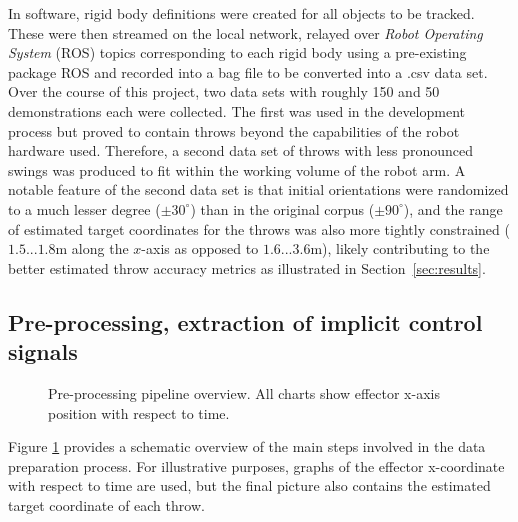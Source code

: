 \documentclass{article}
\begin{document}
In software, rigid body definitions were created for all objects to be tracked. These were then streamed on the local network, relayed over \emph{Robot Operating System} (ROS) topics corresponding to each rigid body using a pre-existing package ROS and recorded into a bag file to be converted into a .csv data set. Over the course of this project, two data sets with roughly 150 and 50 demonstrations each were collected. The first was used in the development process but proved to contain throws beyond the capabilities of the robot hardware used. Therefore, a second data set of throws with less pronounced swings was produced to fit within the working volume of the robot arm. A notable feature of the second data set is that initial orientations were randomized to a much lesser degree ($\pm30^{\circ}$) than in the original corpus ($\pm90^{\circ}$), and the range of estimated target coordinates for the throws was also more tightly constrained ($1.5 ... 1.8$m along the $x$-axis as opposed to $1.6 ... 3.6$m), likely contributing to the better estimated throw accuracy metrics as illustrated in Section~\ref{sec:results}.

\subsection{Pre-processing, extraction of implicit control signals}
\label{sec:preprocess}

\begin{figure}
	\centering
	\caption{Pre-processing pipeline overview. All charts show effector x-axis position with respect to time.}
	\label{fig:fig2}
\end{figure}

Figure \ref{fig:fig2} provides a schematic overview of the main steps involved in the data preparation process. For illustrative purposes, graphs of the effector x-coordinate with respect to time are used, but the final picture also contains the estimated target coordinate of each throw.
\end{document}
